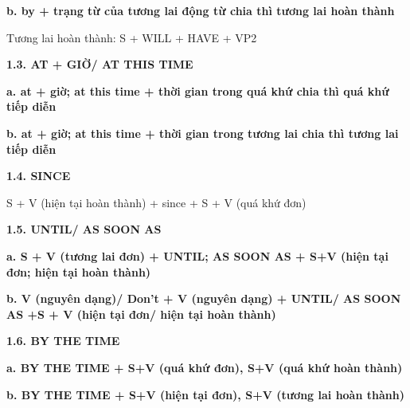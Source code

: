 \documentclass[12pt,a4paper,twoside]{article}
\begin{document}
\par\noindent\hspace{1em}\textbf{b. by + trạng từ của tương lai động từ chia thì tương lai hoàn thành}\par
\par\noindent\hspace{2em}Tương lai hoàn thành: S + WILL + HAVE + VP2\par
\par\noindent\textbf{\large 1.3. AT + GIỜ/ AT THIS TIME}\par\vspace{2pt}
\par\noindent\hspace{1em}\textbf{a. at + giờ; at this time + thời gian trong quá khứ chia thì quá khứ tiếp diễn}\par
\par\noindent\hspace{1em}\textbf{b. at + giờ; at this time + thời gian trong tương lai chia thì tương lai tiếp diễn}\par
\par\noindent\textbf{\large 1.4. SINCE}\par\vspace{2pt}
\par\noindent\hspace{2em}S + V (hiện tại hoàn thành) + since + S + V (quá khứ đơn)\par
\par\noindent\textbf{\large 1.5. UNTIL/ AS SOON AS}\par\vspace{2pt}
\par\noindent\hspace{1em}\textbf{a. S + V (tương lai đơn) + UNTIL; AS SOON AS + S+V (hiện tại đơn; hiện tại hoàn thành)}\par
\par\noindent\hspace{1em}\textbf{b. V (nguyên dạng)/ Don't + V (nguyên dạng) + UNTIL/ AS SOON AS +S + V (hiện tại đơn/ hiện tại hoàn thành)}\par
\par\noindent\textbf{\large 1.6. BY THE TIME}\par\vspace{2pt}
\par\noindent\hspace{1em}\textbf{a. BY THE TIME + S+V (quá khứ đơn), S+V (quá khứ hoàn thành)}\par
\par\noindent\hspace{1em}\textbf{b. BY THE TIME + S+V (hiện tại đơn), S+V (tương lai hoàn thành)}\par
\end{document}
